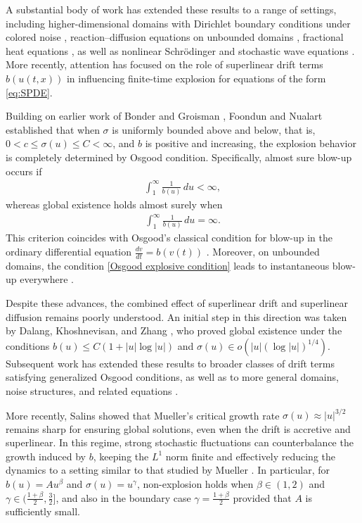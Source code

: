 \documentclass[12pt]{article}
\numberwithin{equation}{section}
\begin{document}
A substantial body of work has extended these results to a range of settings, 
including higher-dimensional domains with Dirichlet boundary conditions under colored noise 
\cite{Franzova1999,Yuyang2025}, 
reaction--diffusion equations on unbounded domains \cite{Krylov1996}, 
fractional heat equations \cite{Bezdek2018,Foondun2019}, 
as well as nonlinear Schr\"odinger and stochastic wave equations 
\cite{Debuss2002,Mueller1997}. 
More recently, attention has focused on the role of superlinear drift terms $b(u(t,x))$ 
in influencing finite-time explosion for equations of the form \eqref{eq:SPDE}.

Building on earlier work of Bonder and Groisman \cite{Bonder2009}, 
Foondun and Nualart \cite{Foondun2021} established that when $\sigma$ is uniformly bounded above and below, 
that is, $0 < c \leq \sigma(u) \leq C < \infty$, and $b$ is positive and increasing, 
the explosion behavior is completely determined by Osgood condition. 
Specifically, almost sure blow-up occurs if
\begin{align}
    \int_1^\infty \frac{1}{b(u)}\,du < \infty, \label{Osgood explosive condition}
\end{align}
whereas global existence holds almost surely when
\begin{align}
    \int_1^\infty \frac{1}{b(u)}\,du = \infty.
\end{align}
This criterion coincides with Osgood’s classical condition for blow-up in the ordinary differential equation $\frac{dv}{dt} = b(v(t))$ \cite{Osgood1898}. 
Moreover, on unbounded domains, the condition \eqref{Osgood explosive condition} leads to instantaneous blow-up everywhere \cite{Foondun2024}.

Despite these advances, the combined effect of superlinear drift and superlinear diffusion remains poorly understood. 
An initial step in this direction was taken by Dalang, Khoshnevisan, and Zhang \cite{Dalang2019}, 
who proved global existence under the conditions $b(u) \leq C(1+|u|\log|u|)$ and 
$\sigma(u) \in o(|u|(\log|u|)^{1/4})$. 
Subsequent work has extended these results to broader classes of drift terms satisfying generalized Osgood conditions, 
as well as to more general domains, noise structures, and related equations 
\cite{AGRESTI2023,chen.huang:23:superlinear,Liang2022,Annie2021,salins2024,salins2025}.

More recently, Salins \cite{Mickey202409} showed that Mueller’s critical growth rate 
$\sigma(u) \approx |u|^{3/2}$ remains sharp for ensuring global solutions, 
even when the drift is accretive and superlinear. 
In this regime, strong stochastic fluctuations can counterbalance the growth induced by $b$, 
keeping the $L^1$ norm finite and effectively reducing the dynamics to a setting similar to that studied by Mueller 
\cite{Mueller1991,Mueller1998,Mueller2000,Mueller1993}. 
In particular, for $b(u)=A u^\beta$ and $\sigma(u)=u^\gamma$, 
non-explosion holds when $\beta \in (1,2)$ and $\gamma \in \bigl(\frac{1+\beta}{2}, \frac{3}{2}\bigr]$, 
and also in the boundary case $\gamma=\frac{1+\beta}{2}$ provided that $A$ is sufficiently small.
\end{document}
